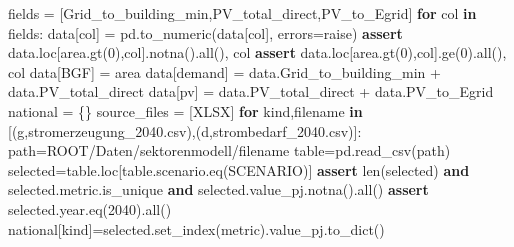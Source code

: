 \documentclass[
  ngerman,
  a4paper,
  DIV=11]{scrreprt}
\newenvironment{Shaded}{\begin{snugshade}}{\end{snugshade}}
\newcommand{\BuiltInTok}[1]{\textcolor[rgb]{0.00,0.23,0.31}{#1}}
\newcommand{\ControlFlowTok}[1]{\textcolor[rgb]{0.00,0.23,0.31}{\textbf{#1}}}
\newcommand{\DecValTok}[1]{\textcolor[rgb]{0.68,0.00,0.00}{#1}}
\newcommand{\KeywordTok}[1]{\textcolor[rgb]{0.00,0.23,0.31}{\textbf{#1}}}
\newcommand{\NormalTok}[1]{\textcolor[rgb]{0.00,0.23,0.31}{#1}}
\newcommand{\OperatorTok}[1]{\textcolor[rgb]{0.37,0.37,0.37}{#1}}
\newcommand{\StringTok}[1]{\textcolor[rgb]{0.13,0.47,0.30}{#1}}
\begin{document}
\begin{Shaded}
\begin{Highlighting}[]
\NormalTok{fields }\OperatorTok{=}\NormalTok{ [}\StringTok{\textquotesingle{}Grid\_to\_building\_min\textquotesingle{}}\NormalTok{,}\StringTok{\textquotesingle{}PV\_total\_direct\textquotesingle{}}\NormalTok{,}\StringTok{\textquotesingle{}PV\_to\_Egrid\textquotesingle{}}\NormalTok{]}
\ControlFlowTok{for}\NormalTok{ col }\KeywordTok{in}\NormalTok{ fields:}
\NormalTok{    data[col] }\OperatorTok{=}\NormalTok{ pd.to\_numeric(data[col], errors}\OperatorTok{=}\StringTok{\textquotesingle{}raise\textquotesingle{}}\NormalTok{)}
    \ControlFlowTok{assert}\NormalTok{ data.loc[area.gt(}\DecValTok{0}\NormalTok{),col].notna().}\BuiltInTok{all}\NormalTok{(), col}
    \ControlFlowTok{assert}\NormalTok{ data.loc[area.gt(}\DecValTok{0}\NormalTok{),col].ge(}\DecValTok{0}\NormalTok{).}\BuiltInTok{all}\NormalTok{(), col}
\NormalTok{data[}\StringTok{\textquotesingle{}BGF\textquotesingle{}}\NormalTok{] }\OperatorTok{=}\NormalTok{ area}
\NormalTok{data[}\StringTok{\textquotesingle{}demand\textquotesingle{}}\NormalTok{] }\OperatorTok{=}\NormalTok{ data.Grid\_to\_building\_min }\OperatorTok{+}\NormalTok{ data.PV\_total\_direct}
\NormalTok{data[}\StringTok{\textquotesingle{}pv\textquotesingle{}}\NormalTok{] }\OperatorTok{=}\NormalTok{ data.PV\_total\_direct }\OperatorTok{+}\NormalTok{ data.PV\_to\_Egrid}
\NormalTok{national }\OperatorTok{=}\NormalTok{ \{\}}
\NormalTok{source\_files }\OperatorTok{=}\NormalTok{ [XLSX]}
\ControlFlowTok{for}\NormalTok{ kind,filename }\KeywordTok{in}\NormalTok{ [(}\StringTok{\textquotesingle{}g\textquotesingle{}}\NormalTok{,}\StringTok{\textquotesingle{}stromerzeugung\_2040.csv\textquotesingle{}}\NormalTok{),(}\StringTok{\textquotesingle{}d\textquotesingle{}}\NormalTok{,}\StringTok{\textquotesingle{}strombedarf\_2040.csv\textquotesingle{}}\NormalTok{)]:}
\NormalTok{    path}\OperatorTok{=}\NormalTok{ROOT}\OperatorTok{/}\StringTok{\textquotesingle{}Daten/sektorenmodell\textquotesingle{}}\OperatorTok{/}\NormalTok{filename}
\NormalTok{    table}\OperatorTok{=}\NormalTok{pd.read\_csv(path)}
\NormalTok{    selected}\OperatorTok{=}\NormalTok{table.loc[table.scenario.eq(SCENARIO)]}
    \ControlFlowTok{assert} \BuiltInTok{len}\NormalTok{(selected) }\KeywordTok{and}\NormalTok{ selected.metric.is\_unique }\KeywordTok{and}\NormalTok{ selected.value\_pj.notna().}\BuiltInTok{all}\NormalTok{()}
    \ControlFlowTok{assert}\NormalTok{ selected.year.eq(}\DecValTok{2040}\NormalTok{).}\BuiltInTok{all}\NormalTok{()}
\NormalTok{    national[kind]}\OperatorTok{=}\NormalTok{selected.set\_index(}\StringTok{\textquotesingle{}metric\textquotesingle{}}\NormalTok{).value\_pj.to\_dict()}

\end{Highlighting}
\end{Shaded}
\end{document}
